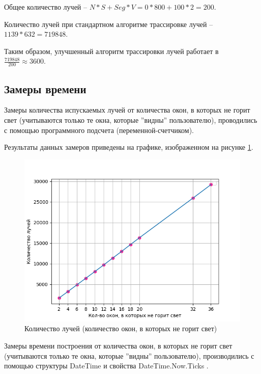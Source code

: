 Общее количество лучей -- $ N * S + Seg * V = 0 * 800 + 100 * 2 = 200$.

Количество лучей при стандартном алгоритме трассировке лучей -- $1139 * 632 = 719 848$. 

Таким образом, улучшенный алгоритм трассировки лучей работает в $\frac{719 848}{200} \approx 3600$. 

\subsection{Замеры времени}

Замеры количества испускаемых лучей от количества окон, в которых не горит свет (учитываются только те окна, которые ''видны'' пользователю), проводились с помощью программного подсчета (переменной-счетчиком).

Результаты данных замеров приведены на графике, изображенном на рисунке \ref{img:e1}.
\begin{figure}[H]
	\begin{center}
		\includegraphics[scale=0.65]{img/res/e1.png}
	\end{center}
	\captionsetup{justification=centering}
	\caption{Количество лучей (количество окон, в которых не горит свет)}
	\label{img:e1}
\end{figure} 

Замеры времени построения от количества окон, в которых не горит свет (учитываются только те окна, которые ''видны'' пользователю), производились с помощью структуры DateTime \cite{csharplang1} и свойства DateTime.Now.Ticks \cite{csharplang2}.

